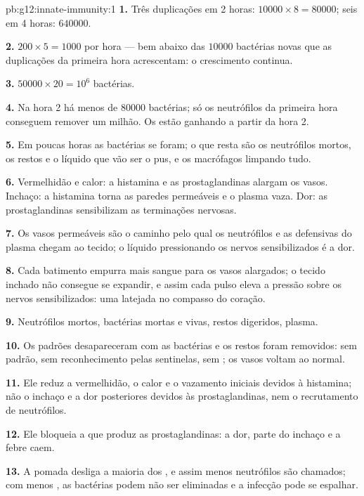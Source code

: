 \begin{solution}{pb:g12:innate-immunity:1}
\textbf{1.} Três duplicações em 2 horas: $\num{10000} \times 8 =
\num{80000}$; seis em 4 horas: $\num{640000}$.

\textbf{2.} $200 \times 5 = 1000$ por hora --- bem abaixo das
$\num{10000}$ bactérias novas que as duplicações da primeira hora
acrescentam: o crescimento continua.

\textbf{3.} $\num{50000} \times 20 = 10^6$ bactérias.

\textbf{4.} Na hora 2 há menos de $\num{80000}$ bactérias; só os
neutrófilos da primeira hora conseguem remover um milhão. Os 
estão ganhando a partir da hora 2.

\textbf{5.} Em poucas horas as bactérias se foram; o que resta são os
neutrófilos mortos, os restos e o líquido que vão ser o pus, e os
macrófagos limpando tudo.

\textbf{6.} Vermelhidão e calor: a histamina e as prostaglandinas
alargam os vasos. Inchaço: a histamina torna as paredes permeáveis e o
plasma vaza. Dor: as prostaglandinas sensibilizam as terminações nervosas.

\textbf{7.} Os vasos permeáveis são o caminho pelo qual os neutrófilos
e as  defensivas do plasma chegam ao tecido; o líquido
pressionando os nervos sensibilizados é a dor.

\textbf{8.} Cada batimento empurra mais sangue para os vasos alargados;
o tecido inchado não consegue se expandir, e assim cada pulso eleva a
pressão sobre os nervos sensibilizados: uma latejada no compasso do coração.

\textbf{9.} Neutrófilos mortos, bactérias mortas e vivas, restos
digeridos, plasma.

\textbf{10.} Os padrões desapareceram com as bactérias e os restos
foram removidos: sem padrão, sem reconhecimento pelas sentinelas, sem
; os vasos voltam ao normal.

\textbf{11.} Ele reduz a vermelhidão, o calor e o vazamento iniciais
devidos à histamina; não o inchaço e a dor posteriores devidos às
prostaglandinas, nem o recrutamento de neutrófilos.

\textbf{12.} Ele bloqueia a  que produz as prostaglandinas: a
dor, parte do inchaço e a febre caem.

\textbf{13.} A pomada desliga a maioria dos , e assim menos
neutrófilos são chamados; com menos , as bactérias podem não
ser eliminadas e a infecção pode se espalhar.


\end{solution}
